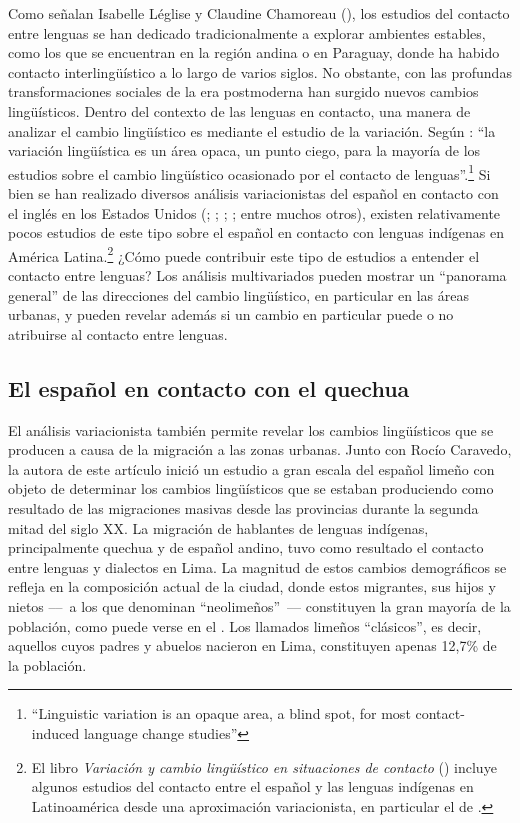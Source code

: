 \documentclass[output=paper]{langscibook}
\begin{document}
Como señalan Isabelle Léglise y Claudine Chamoreau (\citeyear{LégliseChamoreau2013}), los estudios del contacto entre lenguas se han dedicado tradicionalmente a explorar ambientes estables, como los que se encuentran en la región andina o en Paraguay, donde ha habido contacto interlingüístico a lo largo de varios siglos. No obstante, con las profundas transformaciones sociales de la era postmoderna han surgido nuevos cambios lingüísticos. Dentro del contexto de las lenguas en contacto, una manera de analizar el cambio lingüístico es mediante el estudio de la variación. Según  \citet[6]{LégliseChamoreau2013}: “la variación lingüística es un área opaca, un punto ciego, para la mayoría de los estudios sobre el cambio lingüístico ocasionado por el contacto de lenguas”.\footnote{“Linguistic variation is an opaque area, a blind spot, for most contact-induced language change studies”} Si bien se han realizado diversos análisis variacionistas del español en contacto con el inglés en los Estados Unidos (\citealt{Orozco2018}; \citealt{OtheguyZentella2012}; \citealt{Silva-Corvalán1994};  \citealt{TorresCacoullosTravis2011,TorresCacoullosTravis2018}; entre muchos otros), existen relativamente pocos estudios de este tipo sobre el español en contacto con lenguas indígenas en América Latina.\footnote{El libro \emph {Variación y cambio lingüístico en situaciones de contacto} (\citealt{PalaciosAlcaine2017book}) incluye algunos estudios del contacto entre el español y las lenguas indígenas en Latinoamérica desde una aproximación variacionista, en particular el de  \citet{TorresSánchez2017}.} ¿Cómo puede contribuir este tipo de estudios a entender el contacto entre lenguas? Los análisis multivariados pueden mostrar un “panorama general” de las direcciones del cambio lingüístico, en particular en las áreas urbanas, y pueden revelar además si un cambio en particular puede o no atribuirse al contacto entre lenguas.



\subsection{El español en contacto con el quechua}



El análisis variacionista también permite revelar los cambios lingüísticos que se producen a causa de la migración a las zonas urbanas. Junto con Rocío Caravedo, la autora de este artículo inició un estudio a gran escala del español limeño con objeto de determinar los cambios lingüísticos que se estaban produciendo como resultado de las migraciones masivas desde las provincias durante la segunda mitad del siglo XX. La migración de hablantes de lenguas indígenas, principalmente quechua y de español andino, tuvo como resultado el contacto entre lenguas y dialectos en Lima. La magnitud de estos cambios demográficos se refleja en la composición actual de la ciudad, donde estos migrantes, sus hijos y nietos –– a los que  \citet{ArellanoBurgos2004} denominan “neolimeños” –– constituyen la gran mayoría de la población, como puede verse en el . Los llamados limeños “clásicos”, es decir, aquellos cuyos padres y abuelos nacieron en Lima, constituyen apenas 12,7\% de la población.
\end{document}
